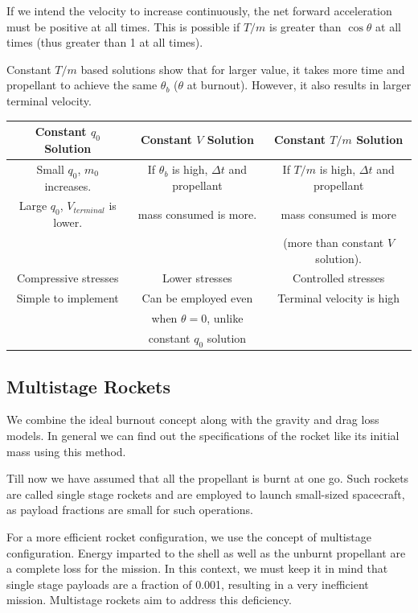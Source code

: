 \documentclass{article}
\theoremstyle{definition}
\begin{document}
If we intend the velocity to increase continuously, the net forward acceleration must be positive at all times. This is possible if $T/m$ is greater than $\cos{\theta}$ at all times (thus greater than 1 at all times).

Constant $T/m$ based solutions show that for larger value, it takes more time and propellant to achieve the same $\theta_b$ ($\theta$ at burnout).
However, it also results in larger terminal velocity. 

\medskip


 
\begin{tabular}{||c|c|c||}
    \hline
    Constant $q_0$ Solution & Constant $V$ Solution & Constant $T/m$ Solution \\
    \hline
    Small $q_0$, $m_0$ increases. & If $\theta_b$ is high, $\Delta t$ and propellant  & If $T/m$ is high, $\Delta t$ and propellant \\
     Large $q_0$, $V_{terminal}$ is lower. & mass consumed is more. & mass consumed is more \\
     & & (more than constant $V$ solution).\\
    \hline
    Compressive stresses  & Lower stresses & Controlled stresses\\
    \hline
    Simple to implement & Can be employed even  & Terminal velocity is high\\
    & when $\theta=0$, unlike  & \\
    & constant $q_0$ solution & \\
    \hline
\end{tabular} \medskip

\subsection{Multistage Rockets}

We combine the ideal burnout concept along with the gravity and drag loss models.
In general we can find out the specifications of the rocket like its initial mass using this method.

Till now we have assumed that all the propellant is burnt at one go. 
Such rockets are called single stage rockets and are employed to launch small-sized spacecraft, as payload fractions are small for such operations. \medskip

For a more efficient rocket configuration, we use the concept of multistage configuration.
Energy imparted to the shell as well as the unburnt propellant are a complete loss for the mission.
In this context, we must keep it in mind that single stage payloads are a fraction of 0.001, resulting in a very inefficient mission.
Multistage rockets aim to address this deficiency.
\end{document}
